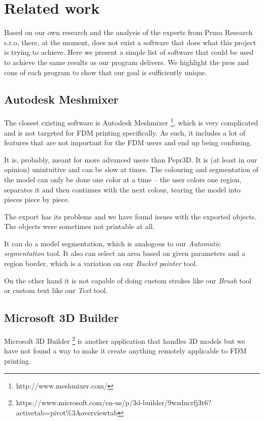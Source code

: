 
\chapter{Related work}

Based on our own research and the analysis of the experts from Prusa Research s.r.o, there, at the moment, does not exist a software that does what this project is trying to achieve. Here we present a simple list of software that could be used to achieve the same results as our program delivers. We highlight the pros and cons of each program to show that our goal is sufficiently unique.

\section{Autodesk Meshmixer}

The closest existing software is Autodesk Meshmixer \footnote{http://www.meshmixer.com/}, which is very complicated and is not targeted for FDM printing specifically. As such, it includes a lot of features that are not important for the FDM users and end up being confusing.

It is, probably, meant for more advanced users than Pepr3D. It is (at least in our opinion) unintuitive and can be slow at times. The colouring and segmentation of the model can only be done one color at a time -- the user colors one region, separates it and then continues with the next colour, tearing the model into pieces piece by piece.

The export has its problems and we have found issues with the exported objects. The objects were sometimes not printable at all.

It can do a model segmentation, which is analogous to our \textit{Automatic segmentation} tool. It also can select an area based on given parameters and a region border, which is a variation on our \textit{Bucket painter} tool.

On the other hand it is not capable of doing custom strokes like our \textit{Brush} tool or custom text like our \textit{Text} tool.

\section{Microsoft 3D Builder}

Microsoft 3D Builder \footnote{https://www.microsoft.com/en-us/p/3d-builder/9wzdncrfj3t6?activetab=pivot\%3Aoverviewtab} is another application that handles 3D models but we have not found a way to make it create anything remotely applicable to FDM printing.

